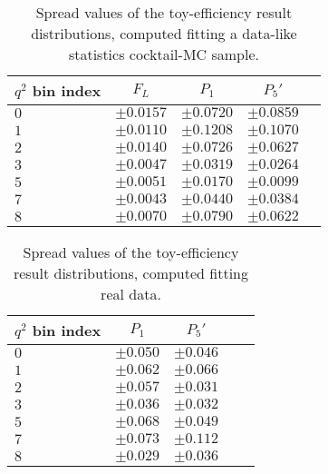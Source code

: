 \begin{table*}[!htb]
  \begin {center}
    \begin{small}
      \caption{Spread values of the toy-efficiency result distributions, computed fitting a data-like statistics cocktail-MC sample.
        \label{tab:lim.MCstat.toy}}
      \begin{tabular}{l|c|c|c|c}
        $q^2$ bin index  & $F_L$ & $P_1$ & $P_5'$ \\
        \hline
        $ 0 $ & $\pm0.0157$ & $\pm0.0720$ & $\pm0.0859$\\
        $ 1 $ & $\pm0.0110$ & $\pm0.1208$ & $\pm0.1070$\\
        $ 2 $ & $\pm0.0140$ & $\pm0.0726$ & $\pm0.0627$\\
        $ 3 $ & $\pm0.0047$ & $\pm0.0319$ & $\pm0.0264$\\
        $ 5 $ & $\pm0.0051$ & $\pm0.0170$ & $\pm0.0099$\\
        $ 7 $ & $\pm0.0043$ & $\pm0.0440$ & $\pm0.0384$\\
        $ 8 $ & $\pm0.0070$ & $\pm0.0790$ & $\pm0.0622$\\
      \end{tabular}
    \end{small}
  \end{center}
\end{table*}

\begin{table*}[!htb]
  \begin {center}
    \begin{small}
      \caption{Spread values of the toy-efficiency result distributions, computed fitting real data.
        \label{tab:lim.MCstat}}
      \begin{tabular}{l|c|c|c|c}
        $q^2$ bin index  & $P_1$ & $P_5'$ \\
        \hline
        $ 0 $ & $\pm0.050$ & $\pm0.046$\\
        $ 1 $ & $\pm0.062$ & $\pm0.066$\\
        $ 2 $ & $\pm0.057$ & $\pm0.031$\\
        $ 3 $ & $\pm0.036$ & $\pm0.032$\\
        $ 5 $ & $\pm0.068$ & $\pm0.049$\\
        $ 7 $ & $\pm0.073$ & $\pm0.112$\\
        $ 8 $ & $\pm0.029$ & $\pm0.036$\\
      \end{tabular}
    \end{small}
  \end{center}
\end{table*}

